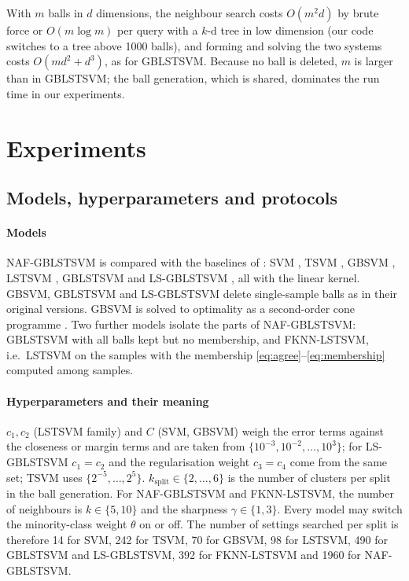 \documentclass[preprint,12pt]{elsarticle}
\newcommand{\NAF}{NAF-GBLSTSVM}
\begin{document}
With $m$ balls in $d$ dimensions, the neighbour search costs $O(m^{2}d)$ by brute force or $O(m\log m)$ per query with a $k$-d tree in low dimension (our code switches to a tree above 1000 balls), and forming and solving the two systems costs $O(md^{2}+d^{3})$, as for GBLSTSVM. Because no ball is deleted, $m$ is larger than in GBLSTSVM; the ball generation, which is shared, dominates the run time in our experiments.

\section{Experiments}
\label{sec:experiments}

\subsection{Models, hyperparameters and protocols}
\label{sec:models}

\paragraph{Models} \NAF{} is compared with the baselines of \cite{tanveer2024gblstsvm}: SVM \cite{cortes1995}, TSVM \cite{jayadeva2007}, GBSVM \cite{xia2022gbsvm}, LSTSVM \cite{kumar2009}, GBLSTSVM and LS-GBLSTSVM \cite{tanveer2024gblstsvm}, all with the linear kernel. GBSVM, GBLSTSVM and LS-GBLSTSVM delete single-sample balls as in their original versions. GBSVM is solved to optimality as a second-order cone programme \cite{diamond2016,goulart2024}. Two further models isolate the parts of \NAF{}: GBLSTSVM with all balls kept but no membership, and FKNN-LSTSVM, i.e.\ LSTSVM on the samples with the membership \eqref{eq:agree}--\eqref{eq:membership} computed among samples.

\paragraph{Hyperparameters and their meaning} $c_1,c_2$ (LSTSVM family) and $C$ (SVM, GBSVM) weigh the error terms against the closeness or margin terms and are taken from $\{10^{-3},10^{-2},\dots,10^{3}\}$; for LS-GBLSTSVM $c_1=c_2$ and the regularisation weight $c_3=c_4$ come from the same set; TSVM uses $\{2^{-5},\dots,2^{5}\}$. $k_{\text{split}}\in\{2,\dots,6\}$ is the number of clusters per split in the ball generation. For \NAF{} and FKNN-LSTSVM, the number of neighbours is $k\in\{5,10\}$ and the sharpness $\gamma\in\{1,3\}$. Every model may switch the minority-class weight $\theta$ on or off. The number of settings searched per split is therefore 14 for SVM, 242 for TSVM, 70 for GBSVM, 98 for LSTSVM, 490 for GBLSTSVM and LS-GBLSTSVM, 392 for FKNN-LSTSVM and 1960 for \NAF{}.
\end{document}
